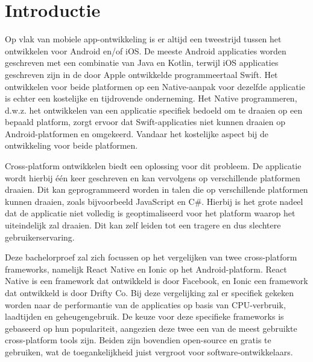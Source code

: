 
\section{Introductie}%
\label{sec:introductie}

Op vlak van mobiele app-ontwikkeling is er altijd een tweestrijd tussen het ontwikkelen voor Android en/of iOS. De meeste Android applicaties worden geschreven met een combinatie van Java en Kotlin, terwijl iOS applicaties geschreven zijn in de door Apple ontwikkelde programmeertaal Swift. Het ontwikkelen voor beide platformen op een Native-aanpak voor dezelfde applicatie is echter een kostelijke en tijdrovende onderneming. Het Native programmeren, d.w.z. het ontwikkelen van een applicatie specifiek bedoeld om te draaien op een bepaald platform, zorgt ervoor dat Swift-applicaties niet kunnen draaien op Android-platformen en omgekeerd. Vandaar het kostelijke aspect bij de ontwikkeling voor beide platformen.

Cross-platform ontwikkelen biedt een oplossing voor dit probleem. De applicatie wordt hierbij één keer geschreven en kan vervolgens op verschillende platformen draaien. Dit kan geprogrammeerd worden in talen die op verschillende platformen kunnen draaien, zoals bijvoorbeeld JavaScript en C#. Hierbij is het grote nadeel dat de applicatie niet volledig is geoptimaliseerd voor het platform waarop het uiteindelijk zal draaien. Dit kan zelf leiden tot een tragere en dus slechtere gebruikerservaring.

Deze bachelorproef zal zich focussen op het vergelijken van twee cross-platform frameworks, namelijk React Native en Ionic op het Android-platform. React Native is een framework dat ontwikkeld is door Facebook, en Ionic een framework dat ontwikkeld is door Drifty Co. Bij deze vergelijking zal er specifiek gekeken worden naar de performantie van de applicaties op basis van CPU-verbruik, laadtijden en geheugengebruik. De keuze voor deze specifieke frameworks is gebaseerd op hun populariteit, aangezien deze twee een van de meest gebruikte cross-platform tools zijn. Beiden zijn bovendien open-source en gratis te gebruiken, wat de toegankelijkheid juist vergroot voor software-ontwikkelaars.

